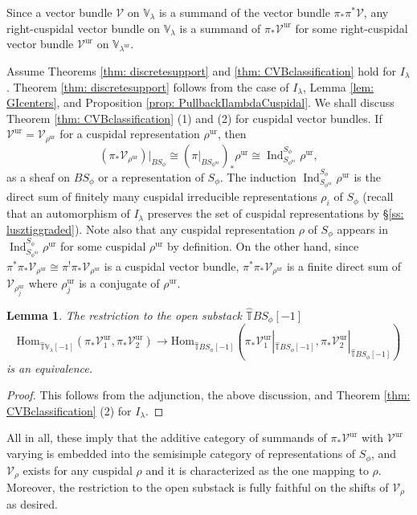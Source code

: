 \documentclass{amsart}
\newtheorem{lemma}[theorem]{Lemma}
\theoremstyle{definition}
\theoremstyle{remark}
\numberwithin{equation}{section}
\DeclareMathOperator{\Ind}{Ind}
\newcommand{\mc}{\mathcal}
\newcommand{\Hom}{\mathrm{Hom}}
\newcommand{\wh}{\widehat}
\newcommand{\ur}{\mathrm{ur}}
\newcommand{\V}{\mathbb{V}}
\newcommand{\T}{\mathbb{T}}
\begin{document}
Since a vector bundle $\mc V$ on $\V_{\lambda}$ is a summand of the vector bundle $\pi_* \pi^* \mc V$, any right-cuspidal vector bundle on $\V_\lambda$ is a summand of $\pi_* \mc V^\ur$ for some right-cuspidal vector bundle $\mc V^\ur$ on $\V_{\lambda^\ur}$. 

Assume Theorems \ref{thm: discretesupport} and \ref{thm: CVBclassification} hold for $I_\lambda$. Theorem \ref{thm: discretesupport} follows from the case of $I_\lambda$, Lemma \ref{lem: GIcenters}, and Proposition \ref{prop: PullbackIlambdaCuspidal}. We shall discuss Theorem \ref{thm: CVBclassification} (1) and (2) for cuspidal vector bundles. If $\mc V^\ur=\mc V_{\rho^\ur}$ for a cuspidal representation $\rho^\ur$, then
\[
(\pi_* \mc V_{\rho^\ur})|_{BS_\phi} \cong (\pi|_{BS_{\phi^\ur}})_* \rho^\ur \cong \Ind_{S_{\phi^\ur}}^{S_\phi} \rho^\ur,
\]
as a sheaf on $BS_{\phi}$ or a representation of $S_\phi$. The induction $\Ind_{S_{\phi^\ur}}^{S_\phi} \rho^\ur$ is the direct sum of finitely many cuspidal irreducible representations $\rho_i$ of $S_\phi$ (recall that an automorphism of $I_\lambda$ preserves the set of cuspidal representations by \S\ref{ss: lusztiggraded}). Note also that any cuspidal representation $\rho$ of $S_\phi$ appears in $\Ind_{S_{\phi^\ur}}^{S_\phi} \rho^\ur$ for some cuspidal $\rho^\ur$ by definition. On the other hand, since $\pi^*\pi_* \mc V_{\rho^\ur}\cong \pi^! \pi_* \mc V_{\rho^\ur}$ is a cuspidal vector bundle, $\pi^*\pi_* \mc V_{\rho^\ur}$ is a finite direct sum of $\mc V_{\rho^\ur_j}$ where $\rho^\ur_j$ is a conjugate of $\rho^\ur$. 

\begin{lemma}\label{lem: OddTangentRestriction}
The restriction to the open substack $\wh{\T}BS_\phi [-1]$ 
\[
\Hom_{\wh{\T}\V_{\lambda}[-1]}(\pi_* \mc V^\ur_1, \pi_* \mc V^\ur_2) \to \Hom_{\wh{\T}BS_\phi[-1]} (\pi_* \mc V^\ur_1|_{\wh{\T}BS_\phi[-1]}, \pi_* \mc V^\ur_2|_{\wh{\T}BS_\phi[-1]})
\]
is an equivalence.   
\end{lemma}

\begin{proof}
This follows from the adjunction, the above discussion, and Theorem \ref{thm: CVBclassification} (2) for $I_\lambda$. 
\end{proof}

All in all, these imply that the additive category of summands of $\pi_* \mc V^\ur$ with $\mc V^\ur$ varying is embedded into the semisimple category of representations of $S_\phi$, and $\mc V_{\rho}$ exists for any cuspidal $\rho$ and it is characterized as the one mapping to $\rho$. Moreover, the restriction to the open substack is fully faithful on the shifts of $\mc V_\rho$ as desired. 
\end{document}
